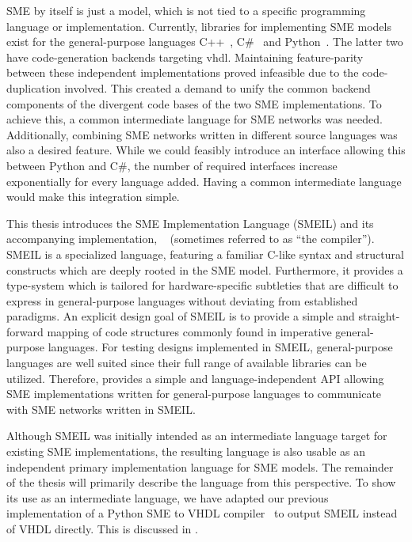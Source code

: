 SME by itself is just a model, which is not tied to a specific programming
language or implementation. Currently, libraries for implementing SME models
exist for the general-purpose languages C++~\cite{asheim2015},
C\#~\cite{skovhede2016building} and Python~\cite{asheim2016vhdl}. The latter two
have code-generation backends targeting \gls{vhdl}. Maintaining feature-parity
between these independent implementations proved infeasible due to the
code-duplication involved. This created a demand to unify the common backend
components of the divergent code bases of the two SME implementations. To
achieve this, a common intermediate language for SME networks was
needed. Additionally, combining SME networks written in different source
languages was also a desired feature. While we could feasibly introduce an
interface allowing this between Python and C\#, the number of required
interfaces increase exponentially for every language added. Having a common
intermediate language would make this integration simple.

This thesis introduces the SME Implementation Language (SMEIL) and its
accompanying implementation, \libsme{}~\cite{libsme} (sometimes referred to as
``the compiler'').
SMEIL is a specialized language, featuring a familiar C-like syntax and
structural constructs which are deeply rooted in the SME model. Furthermore, it
provides a type-system which is tailored for hardware-specific subtleties that
are difficult to express in general-purpose languages without deviating from
established paradigms. An explicit design goal of SMEIL is to provide a simple
and straight-forward mapping of code structures commonly found in imperative
general-purpose languages. For testing designs implemented in SMEIL,
general-purpose languages are well suited since their full range of available
libraries can be utilized. Therefore, \libsme{} provides a simple and
language-independent API allowing SME implementations written for
general-purpose languages to communicate with SME networks written in SMEIL.

Although SMEIL was initially intended as an intermediate language target for
existing SME implementations, the resulting language
is also usable as an independent primary implementation language for SME
models. The remainder of the thesis will primarily describe the language from
this perspective. To show its use as an intermediate language, we have adapted
our previous implementation of a Python SME to VHDL compiler~\cite{almique} to
output SMEIL instead of VHDL directly. This is discussed in .



